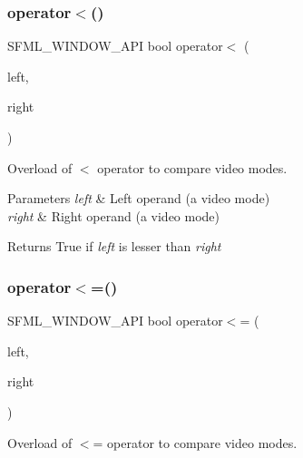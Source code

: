 \subsubsection{\texorpdfstring{operator$<$()}{operator<()}}
{\footnotesize\ttfamily S\+F\+M\+L\+\_\+\+W\+I\+N\+D\+O\+W\+\_\+\+A\+PI bool operator$<$ (\begin{DoxyParamCaption}\item[{const \hyperlink{classsf_1_1_video_mode}{Video\+Mode} \&}]{left,  }\item[{const \hyperlink{classsf_1_1_video_mode}{Video\+Mode} \&}]{right }\end{DoxyParamCaption})\hspace{0.3cm}{\ttfamily [related]}}



Overload of $<$ operator to compare video modes. 


\begin{DoxyParams}{Parameters}
{\em left} & Left operand (a video mode) \\
\hline
{\em right} & Right operand (a video mode)\\
\hline
\end{DoxyParams}
\begin{DoxyReturn}{Returns}
True if {\itshape left} is lesser than {\itshape right} 
\end{DoxyReturn}
\mbox{\label{classsf_1_1_video_mode_a09b0a83f9135d934e540800bad12f0ca}} 
\subsubsection{\texorpdfstring{operator$<$=()}{operator<=()}}
{\footnotesize\ttfamily S\+F\+M\+L\+\_\+\+W\+I\+N\+D\+O\+W\+\_\+\+A\+PI bool operator$<$= (\begin{DoxyParamCaption}\item[{const \hyperlink{classsf_1_1_video_mode}{Video\+Mode} \&}]{left,  }\item[{const \hyperlink{classsf_1_1_video_mode}{Video\+Mode} \&}]{right }\end{DoxyParamCaption})\hspace{0.3cm}{\ttfamily [related]}}



Overload of $<$= operator to compare video modes. 


